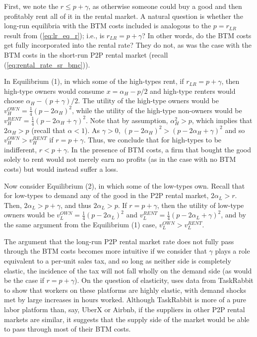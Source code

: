\documentclass[11pt]{article}
\begin{document}
First, we note the $r \le p + \gamma$, as otherwise someone could buy a good and then profitably rent all of it in the rental market.
A natural question is whether the long-run equilibria with the BTM costs included is analogous to the $p = r_{LR}$ result from (\ref{eq:lr_eq_r}); i.e., is $r_{LR} = p + \gamma$? 
In other words, do the BTM costs get fully incorporated into the rental rate?
They do not, as was the case with the BTM costs in the short-run P2P rental market (recall (\ref{eq:rental_rate_sr_bmc})). 

In Equilibrium (1), in which some of the high-types rent, if $r_{LR} = p + \gamma$,  then high-type owners would consume $x = \alpha_H - p/2$ and high-type renters would choose $\alpha_H - (p + \gamma)/2$.
The utility of the high-type owners would be $v_H^{OWN} = \frac{1}{4}(p - 2\alpha_H)^2$, while the utility of the high-type non-owners would be $v_H^{RENT} = \frac{1}{4} \left(p - 2\alpha_H + \gamma \right)^2$.
Note that by assumption, $\alpha_H^2 > p$, which implies that $2 \alpha_H > p$ (recall that $\alpha < 1$).
As $\gamma > 0$, $(p - 2\alpha_H)^2 > (p - 2\alpha_H + \gamma)^2$ and so $v_H^{OWN} > v_H^{RENT}$ if $r = p + \gamma$.
Thus, we conclude that for high-types to be indifferent, $r < p + \gamma$.
In the presence of BTM costs, a firm that bought the good solely to rent would not merely earn no profits (as in the case with no BTM costs) but would instead suffer a loss. 

Now consider Equilibrium (2), in which some of the low-types own.
Recall that for low-types to demand any of the good in the P2P rental market, $2\alpha_L > r$. 
Then, $2\alpha_L > p + \gamma$, and thus $2\alpha_L > p$.
If $r = p + \gamma$, then the utility of low-type owners would be $v_L^{OWN} = \frac{1}{4}(p - 2\alpha_L)^2$ and $v_L^{RENT} = \frac{1}{4}(p - 2\alpha_L + \gamma)^2$, and by the same argument from the Equilibrium (1) case, $v_L^{OWN} > v_L^{RENT}$. 

The argument that the long-run P2P rental market rate does not fully pass through the BTM costs becomes more intuitive if we consider that $\gamma$ plays a role equivalent to a per-unit sales tax, and so long as neither side is completely elastic, the incidence of the tax will not fall wholly on the demand side (as would be the case if $r = p + \gamma$). 
On the question of elasticity, \cite{cullen2014outsourcing} uses data from TaskRabbit to show that workers on these platforms are highly elastic, with demand shocks met by large increases in hours worked.
Although TaskRabbit is more of a pure labor platform than, say, UberX or Airbnb, if the suppliers in other P2P rental markets are similar, it suggests that the supply side of the market would be able to pass through most of their BTM costs. 
\end{document}

